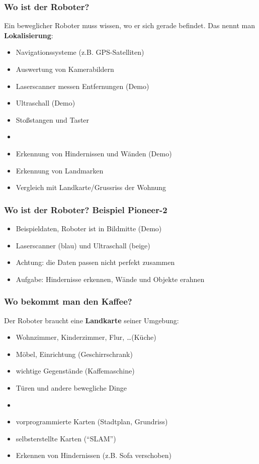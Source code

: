 \documentclass[t]{beamer}
\def\ii{\item[]}
\begin{document}
\begin{frame}
\frametitle{Wo ist der Roboter?}
Ein beweglicher Roboter muss wissen, wo er sich gerade befindet.
Das nennt man \textbf{Lokalisierung}:
\begin{itemize}
\item Navigationssysteme                        \hfill (z.B. GPS-Satelliten)
\item Auswertung von Kamerabildern 
\item Laserscanner messen Entfernungen                         \hfill (Demo)
\item Ultraschall                                              \hfill (Demo)
\item Stoßstangen und Taster
\ii
\item Erkennung von Hindernissen und Wänden                    \hfill (Demo)
\item Erkennung von Landmarken
\item Vergleich mit Landkarte/Grussriss der Wohnung
\end{itemize}
\end{frame}


\begin{frame}
\frametitle{Wo ist der Roboter? Beispiel Pioneer-2}
\begin{itemize}
\item Beispieldaten, Roboter ist in Bildmitte \hfill (Demo)
\item Laserscanner (blau) und Ultraschall (beige)
\item Achtung: die Daten passen nicht perfekt zusammen
\item Aufgabe: Hindernisse erkennen, Wände und Objekte erahnen
\end{itemize}
\end{frame}


\begin{frame}
\frametitle{Wo bekommt man den Kaffee?}
Der Roboter braucht eine \textbf{Landkarte} seiner Umgebung:
\begin{itemize}
\item Wohnzimmer, Kinderzimmer, Flur, \dots                 \hfill (Küche)
\item Möbel, Einrichtung                          \hfill (Geschirrschrank)    
\item wichtige Gegenstände                          \hfill (Kaffemaschine)
\item Türen und andere bewegliche Dinge
\ii
\end{itemize}
\begin{itemize}
\item vorprogrammierte Karten                \hfill (Stadtplan, Grundriss)
\item selbsterstellte Karten                             \hfill ("`SLAM"')
\item Erkennen von Hindernissen              \hfill (z.B. Sofa verschoben)
\end{itemize}
\end{frame}
\end{document}
